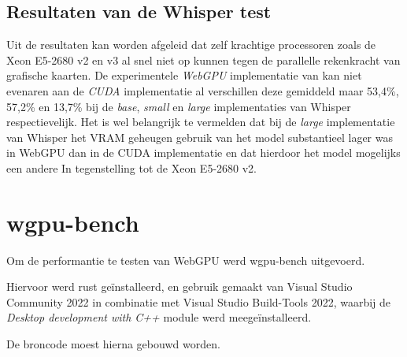 \subsection*{Resultaten van de Whisper test}

Uit de resultaten kan worden afgeleid dat zelf krachtige processoren zoals de Xeon E5-2680 v2 en v3 al snel niet op kunnen tegen de parallelle rekenkracht van grafische kaarten. De experimentele \textit{WebGPU} implementatie van \textcite{Fleetwood2024} kan niet evenaren aan de \textit{CUDA} implementatie al verschillen deze gemiddeld maar 53,4\%, 57,2\% en 13,7\% bij de \textit{base}, \textit{small} en \textit{large} implementaties van Whisper respectievelijk. Het is wel belangrijk te vermelden dat bij de \textit{large} implementatie van Whisper het VRAM geheugen gebruik van het model substantieel lager was in WebGPU dan in de CUDA implementatie en dat hierdoor het model mogelijks een andere In tegenstelling tot de Xeon E5-2680 v2.

\break

\section{wgpu-bench}

Om de performantie te testen van WebGPU werd wgpu-bench uitgevoerd.

Hiervoor werd rust geïnstalleerd, en gebruik gemaakt van Visual Studio Community 2022 in combinatie met Visual Studio Build-Tools 2022, waarbij de \textit{Desktop development with C++} module werd meegeïnstalleerd.

De broncode moest hierna gebouwd worden.


\break{}
